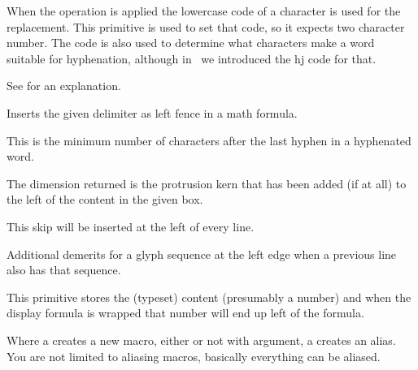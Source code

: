 \stopoldprimitive

\startoldprimitive[title={\prm {lccode}}]

When the  operation is applied the lowercase code of a character
is used for the replacement. This primitive is used to set that code, so it
expects two character number. The code is also used to determine what characters
make a word suitable for hyphenation, although in \LUATEX\ we introduced the \prm
{hj} code for that.

\stopoldprimitive

\startoldprimitive[title={\prm {leaders}}]

See  for an explanation.

\stopoldprimitive

\startoldprimitive[title={\prm {left}}]

Inserts the given delimiter as left fence in a math formula.

\stopoldprimitive

\startoldprimitive[title={\prm {lefthyphenmin}}]

This is the minimum number of characters after the last hyphen in a hyphenated
word.

\stopoldprimitive

\startnewprimitive[title={\prm {leftmarginkern}}]

The dimension returned is the protrusion kern that has been added (if at all)
to the left of the content in the given box.

\stopnewprimitive

\startoldprimitive[title={\prm {leftskip}}]

This skip will be inserted at the left of every line.

\stopoldprimitive

\startnewprimitive[title={\prm {lefttwindemerits}}]

Additional demerits for a glyph sequence at the left edge when a previous line
also has that sequence.

\stopnewprimitive

\startoldprimitive[title={\prm {leqno}}]

This primitive stores the (typeset) content (presumably a number) and when the
display formula is wrapped that number will end up left of the formula.

\stopoldprimitive

\startoldprimitive[title={\prm {let}}]

Where a  creates a new macro, either or not with argument, a 
creates an alias. You are not limited to aliasing macros, basically everything
can be aliased.

